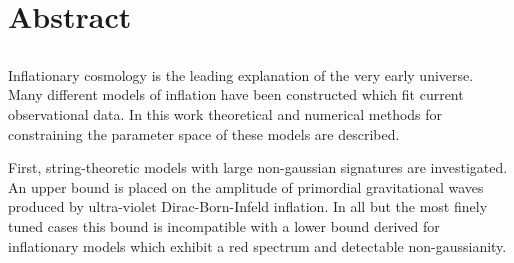 \renewcommand{\CVSrevision}{\version$Id: abstract.tex,v 1.10 2009/08/17 13:57:16 ith Exp $}
% 
% 
\chapter*{Abstract}
\label{ch:abstract}
\section*{}
\singlespacing
Inflationary cosmology is the leading explanation of the very early universe. 
Many different models of inflation have been constructed which fit current observational data.
In this work theoretical and numerical methods for constraining the parameter space of these models
are described.

First, string-theoretic models with large non-gaussian signatures are investigated.
An upper bound is placed on the amplitude of primordial gravitational waves produced by ultra-violet
Dirac-Born-Infeld inflation. In all but the most finely tuned cases this bound is incompatible with
a lower bound derived for inflationary models which exhibit a red spectrum and detectable
non-gaussianity. 


